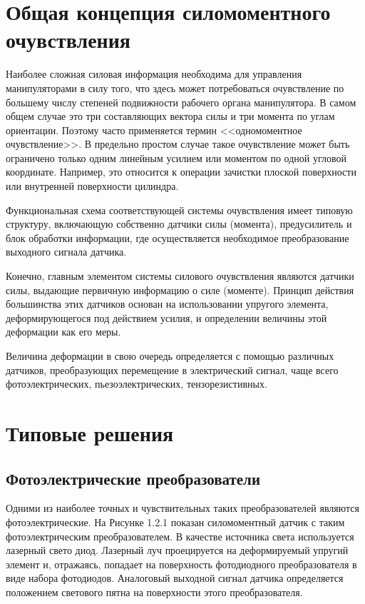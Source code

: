 \documentclass[a4paper,14pt,russian]{extreport} \usepackage{extsizes}
\begin{document}
	\section {Общая концепция силомоментного очувствления}
	Наиболее сложная силовая информация необходима для управления манипуляторами в силу того, что здесь может потребоваться очувствление по большему числу степеней подвижности рабочего органа манипулятора. В самом общем случае это три составляющих вектора силы и три момента по углам ориентации. Поэтому часто применяется термин <<одномоментное очувствление>>. В предельно	простом случае такое очувствление может быть ограничено только 
	одним линейным усилием или моментом по одной угловой координате. Например, это относится к операции зачистки плоской поверхности или внутренней поверхности цилиндра.
	
	Функциональная схема соответствующей системы очувствления имеет типовую структуру, включающую собственно датчики 
	силы (момента), предусилитель и блок обработки информации, где
	осуществляется необходимое преобразование выходного сигнала
	датчика.
	
	Конечно, главным элементом системы силового очувствления
	являются датчики силы, выдающие первичную информацию о силе
	(моменте). Принцип действия большинства этих датчиков основан
	на использовании упругого элемента, деформирующегося под
	действием усилия, и определении величины этой деформации как
	его меры.
	
	Величина деформации в свою очередь определяется с помощью
	различных датчиков, преобразующих перемещение в электрический сигнал, чаще всего фотоэлектрических, пьезоэлектрических,
	тензорезистивных.
	\section {Типовые решения}
	\subsection {Фотоэлектрические преобразователи}
	Одними из наиболее точных и чувствительных таких преобразователей являются фотоэлектрические. На Рисунке 1.2.1 показан	силомоментный датчик с таким фотоэлектрическим преобразователем. В качестве источника света используется лазерный свето	диод. Лазерный луч проецируется на деформируемый упругий
	элемент и, отражаясь, попадает на поверхность фотодиодного
	преобразователя в виде набора фотодиодов. Аналоговый выходной
	сигнал датчика определяется положением светового пятна на поверхности этого преобразователя.		 
\end{document}
